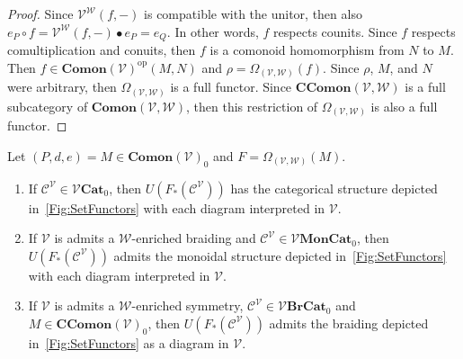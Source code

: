 \begin{proof}
    Since $\mathcal{V}^{\mathcal{W}}( f, - )$ is compatible with the unitor, then also $e_P \circ f = \mathcal{V}^{\mathcal{W}}( f, - ) \bullet e_P = e_Q$.
    In other words, $f$ respects counits.
    Since $f$ respects comultiplication and conuits, then $f$ is a comonoid homomorphism from $N$ to $M$.
    Then $f \in \mathbf{Comon}( \mathcal{V} )^{\text{op}}( M, N )$ and $\rho = \Omega_{(\mathcal{V},\mathcal{W})}( f )$.
    Since $\rho$, $M$, and $N$ were arbitrary, then $\Omega_{(\mathcal{V},\mathcal{W})}$ is a full functor.
    Since $\mathbf{CComon}( \mathcal{V}, \mathcal{W} )$ is a full subcategory of $\mathbf{Comon}( \mathcal{V}, \mathcal{W} )$, then this restriction of $\Omega_{(\mathcal{V},\mathcal{W})}$ is also a full functor.
\end{proof}

\begin{cor}
    \label{Cor:UnderlyingShape}
    Let $( P, d, e ) = M \in \mathbf{Comon}( \mathcal{V} )_0$ and $F = \Omega_{( \mathcal{V}, \mathcal{W} )}( M )$.
    \begin{enumerate}
    \item If $\mathcal{C}^{\mathcal{V}} \in \mathcal{V}\mathbf{Cat}_0$, then $U( F_*( \mathcal{C}^{\mathcal{V}} ) )$ has the categorical structure depicted in~\cref{Fig:SetFunctors} with each diagram interpreted in $\mathcal{V}$.
    \item If $\mathcal{V}$ is admits a $\mathcal{W}$-enriched braiding and $\mathcal{C}^{\mathcal{V}} \in \mathcal{V}\mathbf{MonCat}_0$, then $U( F_*( \mathcal{C}^{\mathcal{V}} ) )$ admits the monoidal structure depicted in~\cref{Fig:SetFunctors} with each diagram interpreted in $\mathcal{V}$.
    \item If $\mathcal{V}$ is admits a $\mathcal{W}$-enriched symmetry, $\mathcal{C}^{\mathcal{V}} \in \mathcal{V}\mathbf{BrCat}_0$ and $M \in \mathbf{CComon}( \mathcal{V} )_0$, then $U( F_*( \mathcal{C}^{\mathcal{V}} ) )$ admits the braiding depicted in~\cref{Fig:SetFunctors} as a diagram in $\mathcal{V}$.
    \end{enumerate}
\end{cor}

